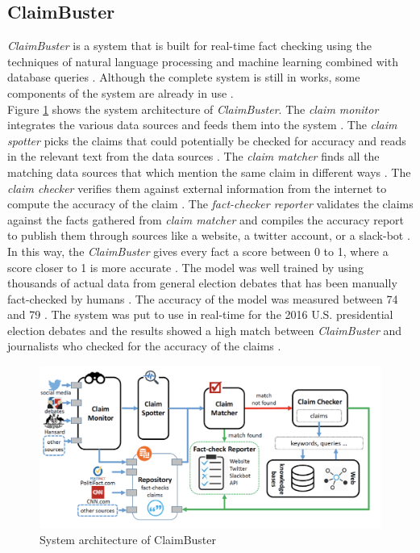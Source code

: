 \documentclass[sigconf]{acmart}
\begin{document}
\subsection{ClaimBuster}
{\em ClaimBuster} is a system that is built for real-time fact checking using the techniques of natural language processing and machine learning combined with database queries \cite{Claimbuster2017}. Although the complete system is still in works, some components of the system are already in use \cite{Claimbuster2017}.\\
Figure \ref{fig:Fig2} shows the system architecture of {\em ClaimBuster}. The {\em claim monitor} integrates the various data sources and feeds them into the system \cite{Claimbuster2017}. The {\em claim spotter} picks the claims that could potentially be checked for accuracy and reads in the relevant text from the data sources \cite{Claimbuster2017}. The {\em claim matcher} finds all the matching data sources that which mention the same claim in different ways \cite{Claimbuster2017}. The {\em claim checker} verifies them against external information from the internet to compute the accuracy of the claim \cite{Claimbuster2017}. The {\em fact-checker reporter} validates the claims against the facts gathered from {\em claim matcher} and compiles the accuracy report to publish them through sources like a website, a twitter account, or a slack-bot \cite{Claimbuster2017}. \\
In this way, the {\em ClaimBuster} gives every fact a score between 0 to 1, where a score closer to 1 is more accurate \cite{Claimbuster2017}. The model was well trained by using thousands of actual data from general election debates that has been manually fact-checked by humans \cite{Claimbuster2017}. The accuracy of the model was measured between 74 and 79 \cite{Claimbuster2017}. The system was put to use in real-time for the 2016 U.S. presidential election debates and the results showed a high match between {\em ClaimBuster} and journalists who checked for the accuracy of the claims \cite{Claimbuster2017}.  

\begin{figure}
\includegraphics[width=1.0\textwidth]{images/fig2.png}
\caption{System architecture of ClaimBuster \cite{Claimbuster2017}}
\label{fig:Fig2}
\end{figure}
\end{document}
